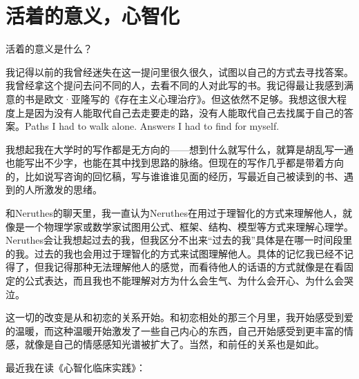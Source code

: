 \chapter{活着的意义，心智化}

活着的意义是什么？

我记得以前的我曾经迷失在这一提问里很久很久，试图以自己的方式去寻找答案。我曾经拿这个提问去问不同的人，去看不同的人对此写的书。我记得最让我感到满意的书是欧文·亚隆写的《存在主义心理治疗》。但这依然不足够。我想这很大程度上是因为没有人能取代自己去走要走的路，没有人能取代自己去找属于自己的答案。Paths I had to walk alone. Answers I had to find for myself.

我想起我在大学时的写作都是无方向的——想到什么就写什么，就算是胡乱写一通也能写出不少字，也能在其中找到思路的脉络。但现在的写作几乎都是带着方向的，比如说写咨询的回忆稿，写与谁谁谁见面的经历，写最近自己被读到的书、遇到的人所激发的思绪。

和Neruthes的聊天里，我一直认为Neruthes在用过于理智化的方式来理解他人，就像是一个物理学家或数学家试图用公式、框架、结构、模型等方式来理解心理学。Neruthes会让我想起过去的我，但我区分不出来“过去的我”具体是在哪一时间段里的我。过去的我也会用过于理智化的方式来试图理解他人。具体的记忆我已经不记得了，但我记得那种无法理解他人的感觉，而看待他人的话语的方式就像是在看固定的公式表达，而且我也不能理解对方为什么会生气、为什么会开心、为什么会哭泣。

这一切的改变是从和初恋的关系开始。和初恋相处的那三个月里，我开始感受到爱的温暖，而这种温暖开始激发了一些自己内心的东西，自己开始感受到更丰富的情感，就像是自己的情感感知光谱被扩大了。当然，和前任的关系也是如此。

最近我在读《心智化临床实践》：

